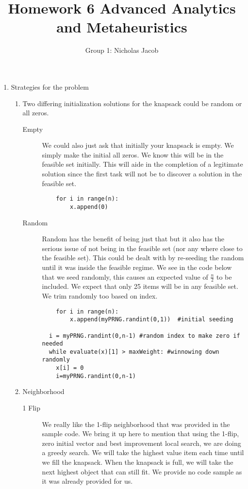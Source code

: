 \documentclass[11pt]{article}
\author{Group 1: Nicholas Jacob}
\title{Homework 6 Advanced Analytics and Metaheuristics}
\begin{document}
\maketitle

\begin{enumerate}
\item Strategies for the problem
\begin{enumerate}
\item Two differing initialization solutions for the knapsack could be random or all zeros.  
\begin{description}
\item[Empty]  We could also just ask that initially your knapsack is empty.  We simply make the initial all zeros.  We know this will be in the feasible set initially.  This will aide in the completion of a legitimate solution since the first task will not be to discover a solution in the feasible set.
\begin{verbatim}
    for i in range(n):
        x.append(0)
\end{verbatim}
\item[Random]  Random has the benefit of being just that but it also has the serious issue of not being in the feasible set (nor any where close to the feasible set).  This could be dealt with by re-seeding the random until it was inside the feasible regime.  We see in the code below that we seed randomly, this causes an expected value of $\frac n2$ to be included.  We expect that only 25 items will be in any feasible set.  We trim randomly too based on index.
\begin{verbatim}
    for i in range(n):
        x.append(myPRNG.randint(0,1))  #initial seeding

  i = myPRNG.randint(0,n-1) #random index to make zero if needed
  while evaluate(x)[1] > maxWeight: #winnowing down randomly
    x[i] = 0
    i=myPRNG.randint(0,n-1)
\end{verbatim}

\end{description}

\item Neighborhood
\begin{description}
\item [1 Flip]  We really like the 1-flip neighborhood that was provided in the sample code.  We bring it up here to mention that using the 1-flip, zero initial vector and best improvement local search, we are doing a greedy search.  We will take the highest value item each time until we fill the knapsack.  When the knapsack is full, we will take the next highest object that can still fit.  We provide no code sample as it was already provided for us.
 



\end{description}
\end{enumerate}
\end{enumerate}
\end{document}
